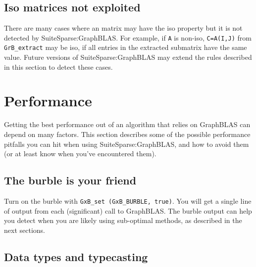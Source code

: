 \documentclass[12pt]{article}
\begin{document}
\subsection{Iso matrices not exploited}

There are many cases where an matrix may have the iso property but it is not
detected by SuiteSparse:GraphBLAS.  For example, if \verb'A' is non-iso,
\verb'C=A(I,J)' from \verb'GrB_extract' may be iso, if all entries in the
extracted submatrix have the same value.  Future versions of
SuiteSparse:GraphBLAS may extend the rules described in this section to detect
these cases.

\newpage
\section{Performance} %
\label{perf}

Getting the best performance out of an algorithm that relies on GraphBLAS can
depend on many factors.  This section describes some of the possible
performance pitfalls you can hit when using SuiteSparse:GraphBLAS, and how to
avoid them (or at least know when you've encountered them).

\subsection{The burble is your friend}

Turn on the burble with \verb'GxB_set (GxB_BURBLE, true)'.  You will get a
single line of output from each (significant) call to GraphBLAS.
The burble output can help you detect when you are likely using sub-optimal
methods, as described in the next sections.

\subsection{Data types and typecasting}
\end{document}
